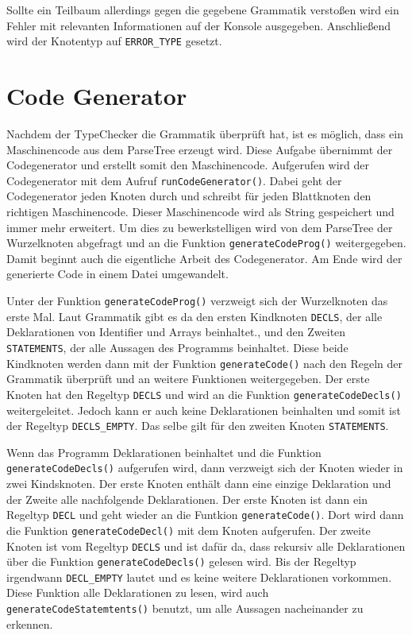Sollte ein Teilbaum allerdings gegen die gegebene Grammatik verstoßen wird ein Fehler mit relevanten Informationen auf der Konsole ausgegeben. Anschließend wird der Knotentyp auf \texttt{ERROR\_TYPE} gesetzt.

\section{Code Generator}
Nachdem der TypeChecker die Grammatik überprüft hat, ist es möglich, dass ein Maschinencode aus dem ParseTree erzeugt wird. Diese Aufgabe übernimmt der Codegenerator und erstellt somit den Maschinencode. Aufgerufen wird der Codegenerator mit dem Aufruf \texttt{runCodeGenerator()}. Dabei geht der Codegenerator jeden Knoten durch und schreibt für jeden Blattknoten den richtigen Maschinencode. Dieser Maschinencode wird als String gespeichert und immer mehr erweitert. Um dies zu bewerkstelligen wird von dem ParseTree der Wurzelknoten abgefragt und an die Funktion \texttt{generateCodeProg()} weitergegeben. Damit beginnt auch die eigentliche Arbeit des Codegenerator. Am Ende wird der generierte Code in einem Datei umgewandelt.



Unter der Funktion \texttt{generateCodeProg()} verzweigt sich der Wurzelknoten das erste Mal.  Laut Grammatik gibt es da den ersten Kindknoten \texttt{DECLS}, der alle Deklarationen von Identifier und Arrays beinhaltet., und den Zweiten \texttt{STATEMENTS}, der alle Aussagen des Programms beinhaltet. Diese beide Kindknoten werden dann mit der Funktion \texttt{generateCode()} nach den Regeln der Grammatik überprüft und an weitere Funktionen weitergegeben. Der erste Knoten hat den Regeltyp \texttt{DECLS} und wird an die Funktion \texttt{generateCodeDecls()} weitergeleitet. Jedoch kann er auch keine Deklarationen beinhalten und somit ist der  Regeltyp \texttt{DECLS\_EMPTY}. Das selbe gilt für den zweiten Knoten \texttt{STATEMENTS}.



Wenn das Programm Deklarationen beinhaltet und die Funktion \texttt{generateCodeDecls()} aufgerufen wird, dann verzweigt sich der Knoten wieder in zwei Kindsknoten. Der erste Knoten enthält dann eine einzige Deklaration und der Zweite alle nachfolgende Deklarationen. Der erste Knoten ist dann ein Regeltyp \texttt{DECL} und geht wieder an die Funtkion \texttt{generateCode()}. Dort wird dann die Funktion \texttt{generateCodeDecl()} mit dem Knoten aufgerufen. Der zweite Knoten ist vom Regeltyp \texttt{DECLS} und ist dafür da, dass rekursiv alle Deklarationen über die Funktion \texttt{generateCodeDecls()} gelesen wird. Bis der Regeltyp irgendwann \texttt{DECL\_EMPTY} lautet und es keine weitere Deklarationen vorkommen. Diese Funktion alle Deklarationen zu lesen, wird auch \texttt{generateCodeStatemtents()} benutzt, um alle Aussagen nacheinander zu erkennen.

